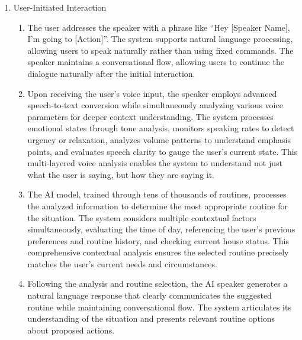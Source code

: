 \documentclass[conference]{IEEEtran}
\begin{document}
\begin{enumerate}[label=\arabic*]
    \item User-Initiated Interaction\par
    \vspace{0.3em}

    \begin{enumerate}[label=\arabic*)]
        \item The user addresses the speaker with a phrase like “Hey [Speaker Name], I'm going to [Action]”. The system supports natural language processing, allowing users to speak naturally rather than using fixed commands. The speaker maintains a conversational flow, allowing users to continue the dialogue naturally after the initial interaction.

        \vspace{0.5em}

        \item Upon receiving the user's voice input, the speaker employs advanced speech-to-text conversion while simultaneously analyzing various voice parameters for deeper context understanding. The system processes emotional states through tone analysis, monitors speaking rates to detect urgency or relaxation, analyzes volume patterns to understand emphasis points, and evaluates speech clarity to gauge the user's current state. This multi-layered voice analysis enables the system to understand not just what the user is saying, but how they are saying it.

        \vspace{0.5em}

        \item The AI model, trained through tens of thousands of routines, processes the analyzed information to determine the most appropriate routine for the situation. The system considers multiple contextual factors simultaneously, evaluating the time of day, referencing the user's previous preferences and routine history, and checking current house status. This comprehensive contextual analysis ensures the selected routine precisely matches the user's current needs and circumstances.

        \vspace{0.5em}

        \item Following the analysis and routine selection, the AI speaker generates a natural language response that clearly communicates the suggested routine while maintaining conversational flow. The system articulates its understanding of the situation and presents relevant routine options about proposed actions. 


\end{enumerate}
\end{enumerate}
\end{document}
